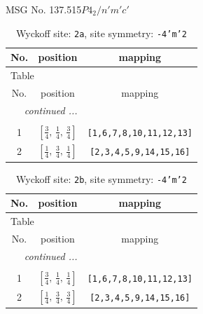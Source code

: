 \documentclass[fleqn,8pt]{jsarticle}
\begin{document}
\setcounter{MaxMatrixCols}{32}

\renewcommand{\tablename}{Table~}
\renewcommand{\figurename}{Figure~}
\begin{center}
\LARGE
MSG No. 137.515\quad$P4_{2}/n'm'c'$
\end{center}
\renewcommand{\arraystretch}{1.2}
\begin{longtable}{ccc}
\caption{Wyckoff site: {\tt 2a}, site symmetry: {\tt -4'm'2}}
 \\
 \hline \hline
No. & position & mapping \\ \hline \endfirsthead

\multicolumn{2}{l}{\tablename\ \thetable{}} \\
 \hline \hline
No. & position & mapping \\ \hline \endhead

 \hline \hline
\multicolumn{2}{r}{\footnotesize\it continued ...} \\ \endfoot

 \hline \hline
\multicolumn{2}{r}{} \\ \endlastfoot

1 & $\left[ \frac{3}{4},\, \frac{1}{4},\, \frac{3}{4} \right]$ & {\tt [1,6,7,8,10,11,12,13]} \\ \hline
2 & $\left[ \frac{1}{4},\, \frac{3}{4},\, \frac{1}{4} \right]$ & {\tt [2,3,4,5,9,14,15,16]} \\
\end{longtable}
\renewcommand{\arraystretch}{1.2}
\begin{longtable}{ccc}
\caption{Wyckoff site: {\tt 2b}, site symmetry: {\tt -4'm'2}}
 \\
 \hline \hline
No. & position & mapping \\ \hline \endfirsthead

\multicolumn{2}{l}{\tablename\ \thetable{}} \\
 \hline \hline
No. & position & mapping \\ \hline \endhead

 \hline \hline
\multicolumn{2}{r}{\footnotesize\it continued ...} \\ \endfoot

 \hline \hline
\multicolumn{2}{r}{} \\ \endlastfoot

1 & $\left[ \frac{3}{4},\, \frac{1}{4},\, \frac{1}{4} \right]$ & {\tt [1,6,7,8,10,11,12,13]} \\ \hline
2 & $\left[ \frac{1}{4},\, \frac{3}{4},\, \frac{3}{4} \right]$ & {\tt [2,3,4,5,9,14,15,16]} \\
\end{longtable}
\end{document}

